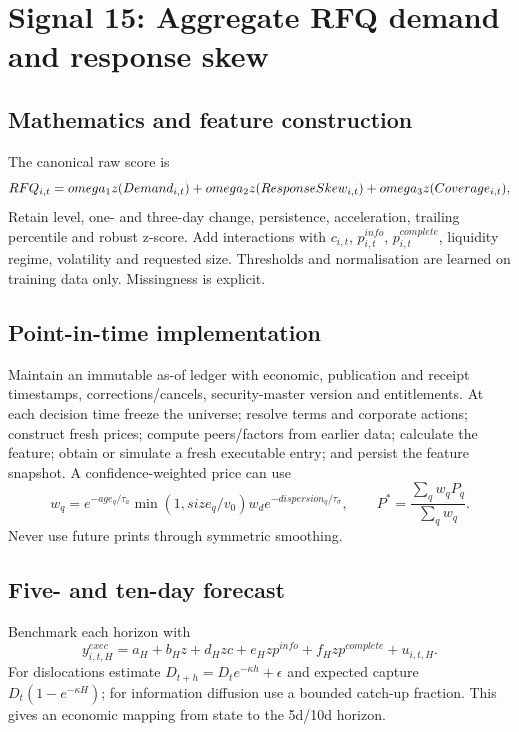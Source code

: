 \documentclass[10pt]{article}
\begin{document}
\section{Signal 15: Aggregate RFQ demand and response skew}
\subsection{Mathematics and feature construction}
The canonical raw score is
\begin{equation}RFQ_{i,t}=\\omega_1z(Demand_{i,t})+\\omega_2z(ResponseSkew_{i,t})+\\omega_3z(Coverage_{i,t}),\end{equation}
Retain level, one- and three-day change, persistence, acceleration, trailing percentile and robust z-score. Add interactions with $c_{i,t}$, $p^{info}_{i,t}$, $p^{complete}_{i,t}$, liquidity regime, volatility and requested size. Thresholds and normalisation are learned on training data only. Missingness is explicit.

\subsection{Point-in-time implementation}
Maintain an immutable as-of ledger with economic, publication and receipt timestamps, corrections/cancels, security-master version and entitlements. At each decision time freeze the universe; resolve terms and corporate actions; construct fresh prices; compute peers/factors from earlier data; calculate the feature; obtain or simulate a fresh executable entry; and persist the feature snapshot. A confidence-weighted price can use
\[w_q=e^{-age_q/\tau_a}\min(1,size_q/v_0)w_d e^{-dispersion_q/\tau_\sigma},\qquad P^*=\frac{\sum_qw_qP_q}{\sum_qw_q}.\]
Never use future prints through symmetric smoothing.

\subsection{Five- and ten-day forecast}
Benchmark each horizon with
\[y^{exec}_{i,t,H}=a_H+b_Hz+d_Hzc+e_Hzp^{info}+f_Hzp^{complete}+u_{i,t,H}.\]
For dislocations estimate $D_{t+h}=D_te^{-\kappa h}+\epsilon$ and expected capture $D_t(1-e^{-\kappa H})$; for information diffusion use a bounded catch-up fraction. This gives an economic mapping from state to the 5d/10d horizon.
\end{document}
